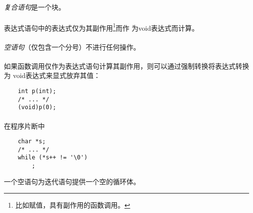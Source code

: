 {                                                
\syntax
\paragraph{}

\semantic
\paragraph{}
\textit{复合语句}是一个块。

\syntax
\paragraph{}

\semantic
\paragraph{}
表达式语句中的表达式仅为其副作用\footnote{比如赋值，具有副作用的函数调用。}而作
为void表达式而计算。

\paragraph{}
\textit{空语句}（仅包含一个分号）不进行任何操作。

\paragraph{}
\ex 如果函数调用仅作为表达式语句计算其副作用，则可以通过强制转换将表达式转换为
void表达式来显式放弃其值：
\begin{lstlisting}
    int p(int);
    /* ... */
    (void)p(0);
\end{lstlisting}

\paragraph{}
\ex 在程序片断中
\begin{lstlisting}
    char *s;
    /* ... */
    while (*s++ != '\0')
        ;
\end{lstlisting}
一个空语句为迭代语句提供一个空的循环体。

}
